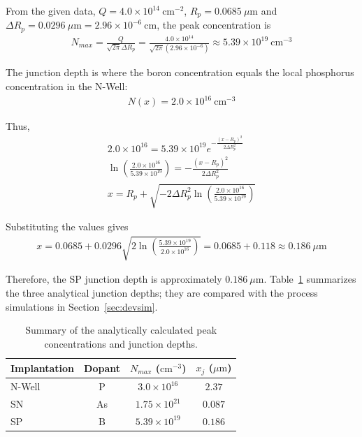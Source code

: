 From the given data, $Q = 4.0 \times 10^{14} \ \mathrm{cm^{-2}}$, $R_p = 0.0685 \ \mu\mathrm{m}$ and $\Delta R_p = 0.0296 \ \mu\mathrm{m} = 2.96 \times 10^{-6} \ \mathrm{cm}$, the peak concentration is
\begin{gather*}
    N_{max}=\frac{Q}{\sqrt{2\pi}\Delta R_p}
    =\frac{4.0 \times 10^{14}}
    {\sqrt{2\pi}(2.96 \times 10^{-6})} \approx 5.39 \times 10^{19} \ \mathrm{cm^{-3}}
\end{gather*}

The junction depth is where the boron concentration equals the local phosphorus concentration in the N-Well:
\begin{gather*}
    N(x)=2.0 \times 10^{16} \ \mathrm{cm^{-3}}
\end{gather*}

Thus,
\begin{gather*}
    2.0 \times 10^{16}
    =
    5.39 \times 10^{19}
    e^{-\frac{(x-R_p)^2}{2\Delta R_p^2}} \\
    \ln\left(\frac{2.0 \times 10^{16}}{5.39 \times 10^{19}}\right)
    =
    -\frac{(x-R_p)^2}{2\Delta R_p^2} \\
    x = R_p + \sqrt{-2\Delta R_p^2
    \ln\left(\frac{2.0 \times 10^{16}}{5.39 \times 10^{19}}\right)}
\end{gather*}

Substituting the values gives
\begin{gather*}
    x = 0.0685 + 0.0296\sqrt{2\ln\left(\frac{5.39 \times 10^{19}}{2.0 \times 10^{16}}\right)}
    = 0.0685 + 0.118 \approx 0.186 \ \mu\mathrm{m}
\end{gather*}

Therefore, the SP junction depth is approximately $0.186~\mu\mathrm{m}$. Table~\ref{tab:ch2-xj-summary} summarizes the three analytical junction depths; they are compared with the process simulations in Section~\ref{sec:devsim}.

\begin{table}[H]
    \centering
    \caption{Summary of the analytically calculated peak concentrations and junction depths.}
    \label{tab:ch2-xj-summary}
    \begin{tabular}{lccc}
        \toprule
        Implantation & Dopant & $N_{max}$ ($\mathrm{cm^{-3}}$) & $x_j$ ($\mu\mathrm{m}$) \\
        \midrule
        N-Well & P  & $3.0 \times 10^{16}$ & $2.37$ \\
        SN     & As & $1.75 \times 10^{21}$ & $0.087$ \\
        SP     & B  & $5.39 \times 10^{19}$ & $0.186$ \\
        \bottomrule
    \end{tabular}
\end{table}

